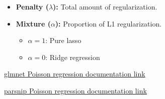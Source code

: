 \documentclass{beamer}
\begin{document}
\begin{frame}
    \vspace{-0.3cm}

    \begin{itemize}
        \item \textbf{Penalty ($\lambda$):} Total amount of regularization.
        \item \textbf{Mixture ($\alpha$):} Proportion of L1 regularization.
        \begin{itemize}
            \item $\alpha=1$: Pure lasso
            \item $\alpha=0$: Ridge regression
        \end{itemize}
    \end{itemize}

    \vfill

    \tiny
    \href{https://glmnet.stanford.edu/articles/glmnet.html\#poisson-regression-family-poisson}{glmnet Poisson regression documentation link}

    \href{https://parsnip.tidymodels.org/reference/poisson_reg.html}{parsnip Poisson regression documentation link}

\end{frame}
\end{document}
